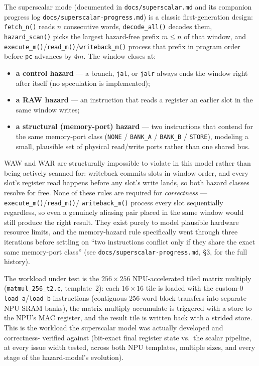 \documentclass[11pt]{article}
\begin{document}
The superscalar mode (documented in \texttt{docs/superscalar.md} and its
companion progress log \texttt{docs/superscalar-progress.md}) is a classic
first-generation design: \texttt{fetch\_n()} reads $n$ consecutive words,
\texttt{decode\_all()} decodes them, \texttt{hazard\_scan()} picks the
largest hazard-free prefix $m \le n$ of that window, and
\texttt{execute\_m()}/\texttt{read\_m()}/\texttt{writeback\_m()} process that
prefix in program order before \texttt{pc} advances by $4m$. The window
closes at:
\begin{itemize}
  \item \textbf{a control hazard} --- a branch, \texttt{jal}, or
    \texttt{jalr} always ends the window right after itself (no
    speculation is implemented);
  \item \textbf{a RAW hazard} --- an instruction that reads a register an
    earlier slot in the same window writes;
  \item \textbf{a structural (memory-port) hazard} --- two instructions
    that contend for the same memory-port class (\texttt{NONE} /
    \texttt{BANK\_A} / \texttt{BANK\_B} / \texttt{STORE}), modeling a small,
    plausible set of physical read/write ports rather than one shared bus.
\end{itemize}
WAW and WAR are structurally impossible to violate in this model rather than
being actively scanned for: writeback commits slots in window order, and
every slot's register read happens before any slot's write lands, so both
hazard classes resolve for free. None of these rules are required for
\emph{correctness} --- \texttt{execute\_m()}/\texttt{read\_m()}/
\texttt{writeback\_m()} process every slot sequentially regardless, so even a
genuinely aliasing pair placed in the same window would still produce the
right result. They exist purely to model plausible hardware resource limits,
and the memory-hazard rule specifically went through three iterations before
settling on ``two instructions conflict only if they share the exact same
memory-port class'' (see \texttt{docs/superscalar-progress.md}, \S3, for the
full history).

The workload under test is the $256\times256$ NPU-accelerated tiled matrix
multiply (\texttt{matmul\_256\_t2.c}, template~2): each $16\times16$ tile is
loaded with the custom-0 \texttt{load\_a}/\texttt{load\_b} instructions
(contiguous 256-word block transfers into separate NPU SRAM banks), the
matrix-multiply-accumulate is triggered with a store to the NPU's MAC
register, and the result tile is written back with a strided store. This is
the workload the superscalar model was actually developed and correctness-
verified against (bit-exact final register state vs.\ the scalar pipeline,
at every issue width tested, across both NPU templates, multiple sizes, and
every stage of the hazard-model's evolution).
\end{document}

